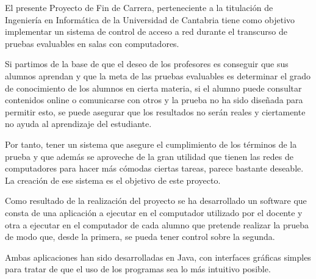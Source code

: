 





El presente Proyecto de Fin de Carrera, perteneciente a la titulación de Ingeniería en Informática de la Universidad de Cantabria tiene como objetivo implementar un sistema de control de acceso a red durante el transcurso de pruebas evaluables en salas con computadores.
\newline

Si partimos de la base de que el deseo de los profesores es conseguir que sus alumnos aprendan y que la meta de las pruebas evaluables es determinar el grado de conocimiento de los alumnos en cierta materia, si el alumno puede consultar contenidos online o comunicarse con otros y la prueba no ha sido diseñada para permitir esto, se puede asegurar que los resultados no serán reales y ciertamente no ayuda al aprendizaje del estudiante.
\newline

Por tanto, tener un sistema que asegure el cumplimiento de los términos de la prueba y que además se aproveche de la gran utilidad que tienen las redes de computadores para hacer más cómodas ciertas tareas, parece bastante deseable. La creación de ese sistema es el objetivo de este proyecto.
\newline

Como resultado de la realización del proyecto se ha desarrollado un software que consta de una aplicación a ejecutar en el computador utilizado por el docente y otra a ejecutar en el computador de cada alumno que pretende realizar la prueba de modo que, desde la primera, se pueda tener control sobre la segunda.
\newline

Ambas aplicaciones han sido desarrolladas en Java, con interfaces gráficas simples para tratar de que el uso de los programas sea lo más intuitivo posible.




